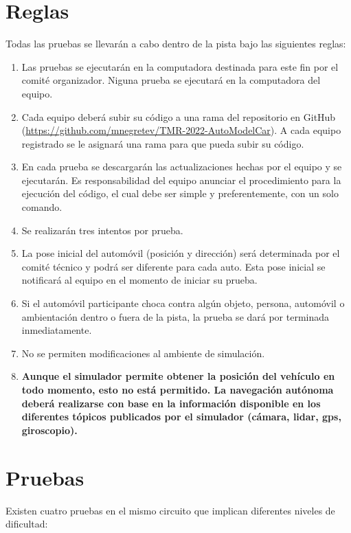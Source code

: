 \documentclass[letterpaper,12pt]{article}
\begin{document}
\section{Reglas}
Todas las pruebas se llevarán a cabo dentro de la pista bajo las siguientes reglas:
\begin{enumerate}
\item Las pruebas se ejecutarán en la computadora destinada para este fin por el comité organizador. Niguna prueba se ejecutará en la computadora del equipo.

\item Cada equipo deberá subir su código a una rama del repositorio en GitHub (\url{https://github.com/mnegretev/TMR-2022-AutoModelCar}). A cada equipo registrado se le asignará una rama para que pueda subir su código.

\item En cada prueba se descargarán las actualizaciones hechas por el equipo y se ejecutarán. Es responsabilidad del equipo anunciar el procedimiento para la ejecución del código, el cual debe ser simple y preferentemente, con un solo comando.

\item Se realizarán tres intentos por prueba.

\item La pose inicial del automóvil (posición y dirección) será determinada por el comité técnico y podrá ser diferente para cada auto. Esta pose inicial se notificará al equipo en el momento de iniciar su prueba.

\item Si el automóvil participante choca contra algún objeto, persona, automóvil o ambientación dentro o fuera de la pista, la prueba se dará por terminada inmediatamente.

\item No se permiten modificaciones al ambiente de simulación.

\item \textbf{Aunque el simulador permite obtener la posición del vehículo en todo momento, esto no está permitido. La navegación autónoma deberá realizarse con base en la información disponible en los diferentes tópicos publicados por el simulador (cámara, lidar, gps, giroscopio).}
\end{enumerate}

\section{Pruebas}
Existen cuatro pruebas en el mismo circuito que implican diferentes niveles de dificultad:
\end{document}
